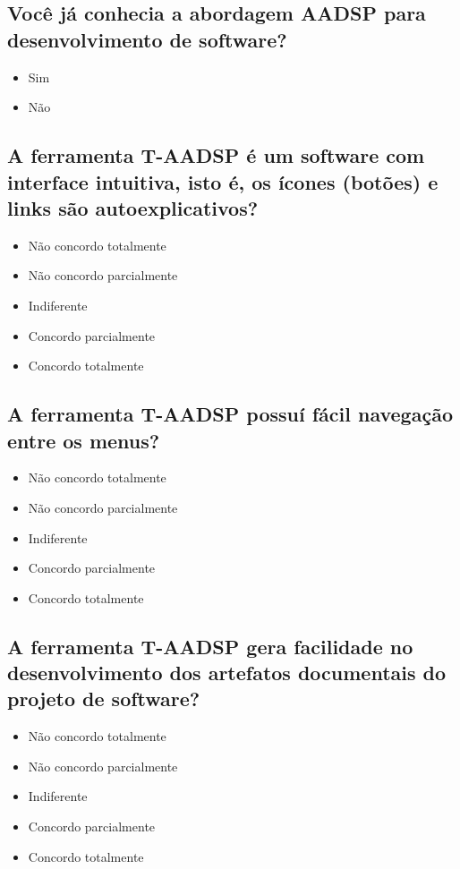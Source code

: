 \documentclass{acm_proc_article-sp}
\begin{document}
\begin{appendices}
\subsection{Você já conhecia a abordagem AADSP para desenvolvimento de software?}
\begin{itemize}
\item Sim
\item Não
\end{itemize}

\subsection{A ferramenta T-AADSP é um software com interface intuitiva, isto é, os ícones (botões) e links são autoexplicativos?}
\begin{itemize}
\item Não concordo totalmente
\item Não concordo parcialmente
\item Indiferente
\item Concordo parcialmente
\item Concordo totalmente
\end{itemize}

\subsection{A ferramenta T-AADSP possuí fácil navegação entre os menus?}
\begin{itemize}
\item Não concordo totalmente
\item Não concordo parcialmente
\item Indiferente
\item Concordo parcialmente
\item Concordo totalmente
\end{itemize}

\subsection{A ferramenta T-AADSP gera facilidade no desenvolvimento dos artefatos documentais do projeto de software?}
\begin{itemize}
\item Não concordo totalmente
\item Não concordo parcialmente
\item Indiferente
\item Concordo parcialmente
\item Concordo totalmente
\end{itemize}


\end{appendices}
\end{document}
